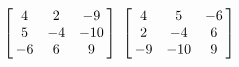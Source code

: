 {$\left[\hskip -3pt \begin{array}{ccc} 4&2&-9\\  5&-4&-10
\\  -6&6&9\end{array}\hskip -3pt \right] $}
{$\left[\hskip -3pt \begin{array}{ccc} 4&5&-6\\  2&-4&6
\\  -9&-10&9\end{array}\hskip -3pt \right]$ 
}
